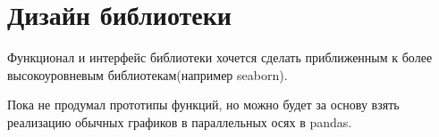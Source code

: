 \documentclass[12pt,fleqn]{article}
\begin{document}
\section{Дизайн библиотеки}
Функционал и интерфейс библиотеки хочется сделать приближенным к более высокоуровневым библиотекам(например seaborn).

Пока не продумал прототипы функций, но можно будет за основу взять реализацию обычных графиков в параллельных осях в pandas.
\end{document}
